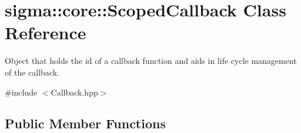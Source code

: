 \hypertarget{classsigma_1_1core_1_1_scoped_callback}{}\section{sigma\+:\+:core\+:\+:Scoped\+Callback Class Reference}
\label{classsigma_1_1core_1_1_scoped_callback}


Object that holds the id of a callback function and aids in life cycle management of the callback.  




{\ttfamily \#include $<$Callback.\+hpp$>$}

\subsection*{Public Member Functions}
